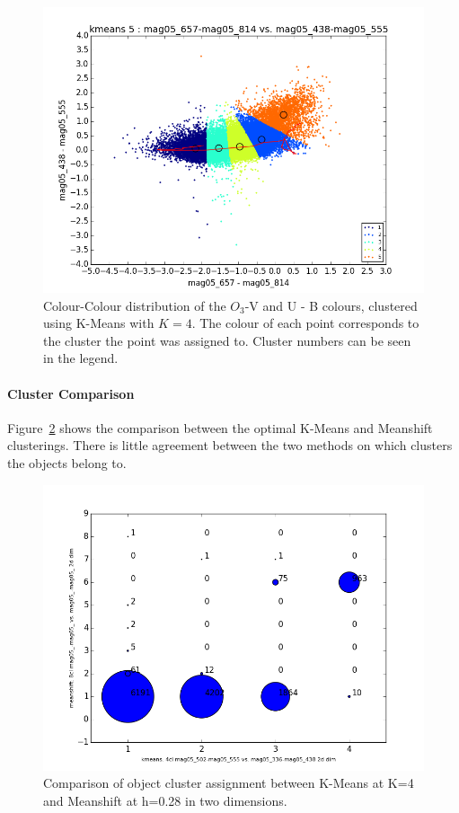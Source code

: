 \begin{figure}
\centering
\includegraphics[width=\linewidth]{figs/unsuccessful/kmeans_color_5cl_mag05_657-mag05_814vsmag05_438-mag05_555}
\caption{Colour-Colour distribution of the $O_{3}$-V and U - B colours, clustered using K-Means with $K=4$. The colour of each point corresponds to the cluster the point was assigned to. Cluster numbers can be seen in the legend.}
\label{fig:OIIIV2dKM}
\end{figure}

\paragraph{Cluster Comparison}
Figure~\ref{fig:OIIIV2dcomp} shows the comparison between the optimal K-Means and Meanshift clusterings.
There is little agreement between the two methods on which clusters the objects belong to.

\begin{figure}[H]
\centering
\includegraphics[width=\linewidth]{figs/unsuccessful/kmeans-4cl_mag05_502-mag05_555_vs_meanshift-8cl_mag05_-mag05__mag05_-mag05__2ddim_compare}
\caption{Comparison of object cluster assignment between K-Means at K=4 and Meanshift at h=0.28 in two dimensions.}
\label{fig:OIIIV2dcomp}
\end{figure}

